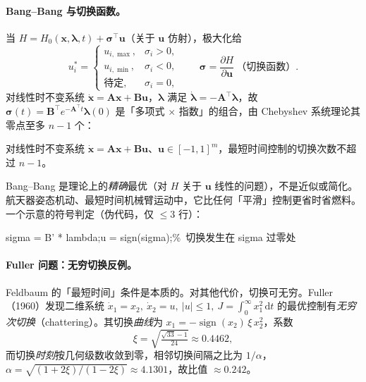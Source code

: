 \paragraph{Bang--Bang 与切换函数。}
当 $H=H_0(\mathbf x,\boldsymbol\lambda,t)+\boldsymbol\sigma^\top\mathbf u$（关于 $\mathbf u$ 仿射），极大化给
\begin{equation}
  u^\ast_i=\begin{cases}u_{i,\max},&\sigma_i>0,\\ u_{i,\min},&\sigma_i<0,\\ \text{待定},&\sigma_i=0,\end{cases}\qquad
  \boldsymbol\sigma=\frac{\partial H}{\partial\mathbf u}\ \text{（切换函数）}.
  \label{eq:pmp-switching}
\end{equation}
对线性时不变系统 $\dot{\mathbf x}=\mathbf A\mathbf x+\mathbf B\mathbf u$，$\boldsymbol\lambda$ 满足 $\dot{\boldsymbol\lambda}=-\mathbf A^\top\boldsymbol\lambda$，故 $\boldsymbol\sigma(t)=\mathbf B^\top e^{-\mathbf A^\top t}\boldsymbol\lambda(0)$ 是「多项式 $\times$ 指数」的组合，由 Chebyshev 系统理论其零点至多 $n-1$ 个：

\begin{theorem}\label{thm:pmp-feldbaum}
对线性时不变系统 $\dot{\mathbf x}=\mathbf A\mathbf x+\mathbf B\mathbf u$、$\mathbf u\in[-1,1]^m$，最短时间控制的切换次数不超过 $n-1$\cite{feldbaum1953optimal}。
\end{theorem}

\begin{pitfall}
Bang--Bang 是理论上的\emph{精确}最优（对 $H$ 关于 $\mathbf u$ 线性的问题），不是近似或简化。航天器姿态机动、最短时间机械臂运动中，它比任何「平滑」控制更省时省燃料。一个示意的符号判定（伪代码，仅 $\le 3$ 行）：

\begin{center}\small\ttfamily
sigma = B' * lambda;\qquad u = sign(sigma);\qquad \%\ 切换发生在 sigma 过零处
\end{center}
\end{pitfall}

\paragraph{Fuller 问题：无穷切换反例。}
Feldbaum 的「最短时间」条件是本质的。对其他代价，切换可无穷。Fuller（1960）发现二维系统 $\dot x_1=x_2,\ \dot x_2=u,\ |u|\le1,\ J=\int_0^\infty x_1^2\,\mathrm dt$ 的最优控制有\emph{无穷次切换}（chattering）\cite{fuller1960relay}。其切换\emph{曲线}为 $x_1=-\operatorname{sign}(x_2)\,\xi\,x_2^2$，系数
\begin{equation}
  \xi=\sqrt{\tfrac{\sqrt{33}-1}{24}}\approx 0.4462,
  \label{eq:pmp-fuller-xi}
\end{equation}
而切换\emph{时刻}按几何级数收敛到零，相邻切换间隔之比为 $1/\alpha$，$\alpha=\sqrt{(1+2\xi)/(1-2\xi)}\approx 4.1301$，故比值 $\approx 0.242$。

